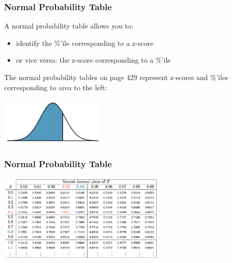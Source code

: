 \documentclass[handout]{beamer}
\newcommand{\blue}[1]{\textcolor{blue2}{#1}}
\begin{document}
\begin{frame}
\frametitle{Normal Probability Table}

A \blue{normal probability table} allows you to:
\begin{itemize}
\item identify the \%'ile corresponding to a z-score
\item or vice versa: the z-score corresponding to a \%'ile
\end{itemize}

\vspace{0.5cm}

\pause The normal probability tables on page 429 represent z-scores and \%'iles corresponding to area to the left:
\begin{center}
\includegraphics[width=5cm]{figure/area_left.png}
\end{center}

\end{frame}



\begin{frame}
\frametitle{Normal Probability Table}
\begin{center}
\includegraphics[width=8cm]{figure/normal_table.png}
\end{center}

%
%


\end{frame}
\end{document}
